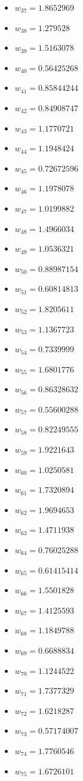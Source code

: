 \documentclass[11pt]{article}
\begin{document}
\begin{itemize}
\item $w_{37} = 1.8652969$
\item $w_{38} = 1.279528$
\item $w_{39} = 1.5163078$
\item $w_{40} = 0.56425268$
\item $w_{41} = 0.85844244$
\item $w_{42} = 0.84908747$
\item $w_{43} = 1.1770721$
\item $w_{44} = 1.1948424$
\item $w_{45} = 0.72672596$
\item $w_{46} = 1.1978078$
\item $w_{47} = 1.0199882$
\item $w_{48} = 1.4966034$
\item $w_{49} = 1.0536321$
\item $w_{50} = 0.88987154$
\item $w_{51} = 0.60814813$
\item $w_{52} = 1.8205611$
\item $w_{53} = 1.1367723$
\item $w_{54} = 0.7339999$
\item $w_{55} = 1.6801776$
\item $w_{56} = 0.86328632$
\item $w_{57} = 0.55600288$
\item $w_{58} = 0.82249555$
\item $w_{59} = 1.9221643$
\item $w_{60} = 1.0250581$
\item $w_{61} = 1.7320894$
\item $w_{62} = 1.9694653$
\item $w_{63} = 1.4711938$
\item $w_{64} = 0.76025288$
\item $w_{65} = 0.61415414$
\item $w_{66} = 1.5501828$
\item $w_{67} = 1.4125593$
\item $w_{68} = 1.1849788$
\item $w_{69} = 0.6688834$
\item $w_{70} = 1.1244522$
\item $w_{71} = 1.7377329$
\item $w_{72} = 1.6218287$
\item $w_{73} = 0.57174007$
\item $w_{74} = 1.7760546$
\item $w_{75} = 1.6726101$

\end{itemize}
\end{document}
